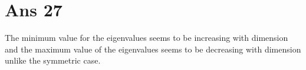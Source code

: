 \documentclass[10pt]{article}
\begin{document}
\begin{flushleft}
\begin{figure}[!htb]
\begin{floatrow}
    \end{floatrow}
\end{figure}
\begin{figure}[!htb]
    \begin{floatrow}
    \end{floatrow}
\end{figure}
\end{flushleft}
\section*{Ans 27}
\begin{flushleft}
The minimum value for the eigenvalues seems to be increasing with dimension and the maximum value of the eigenvalues seems to be decreasing with dimension unlike the symmetric case. 
\end{flushleft}
\end{document}
